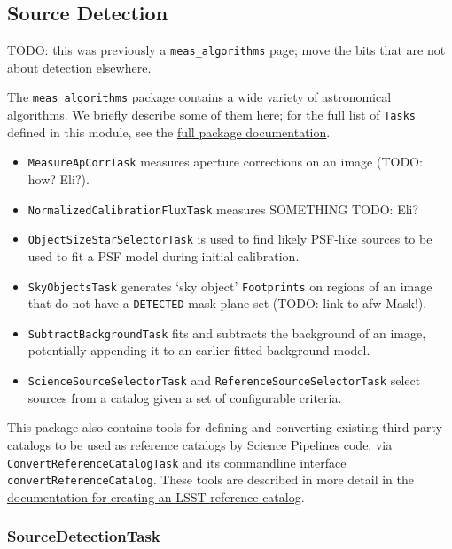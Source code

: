 \subsection{Source Detection}
\label{sec:detection}

TODO: this was previously a \texttt{meas\_algorithms} page; move the bits that are not about detection elsewhere.

The \texttt{meas\_algorithms} package contains a wide variety of astronomical algorithms.
We briefly describe some of them here; for the full list of \texttt{Tasks} defined in this module, see the \href{https://pipelines.lsst.io/v/daily/modules/lsst.meas.algorithms/index.html}{full package documentation}.

\begin{itemize}
    \item \texttt{MeasureApCorrTask} measures aperture corrections on an image (TODO: how? Eli?).
    \item \texttt{NormalizedCalibrationFluxTask} measures SOMETHING TODO: Eli?
    \item \texttt{ObjectSizeStarSelectorTask} is used to find likely PSF-like sources to be used to fit a PSF model during initial calibration.
    \item \texttt{SkyObjectsTask} generates `sky object' \texttt{Footprints} on regions of an image that do not have a \texttt{DETECTED} mask plane set (TODO: link to afw Mask!).
    \item \texttt{SubtractBackgroundTask} fits and subtracts the background of an image, potentially appending it to an earlier fitted background model.
    \item \texttt{ScienceSourceSelectorTask} and \texttt{ReferenceSourceSelectorTask} select sources from a catalog given a set of configurable criteria.
\end{itemize}

This package also contains tools for defining and converting existing third party catalogs to be used as reference catalogs by Science Pipelines code, via \texttt{ConvertReferenceCatalogTask} and its commandline interface \texttt{convertReferenceCatalog}.
These tools are described in more detail in the \href{https://pipelines.lsst.io/v/daily/modules/lsst.meas.algorithms/creating-a-reference-catalog.html}{documentation for creating an LSST reference catalog}.

\subsubsection{SourceDetectionTask}
\label{sec:SourceDetectionTask}

